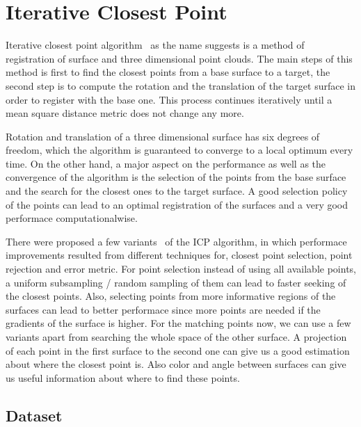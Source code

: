 \section{Iterative Closest Point}
\label{icp}

Iterative closest point algorithm~\cite{icpOr} as the name suggests is a method of registration of surface and three dimensional point clouds. The main steps of this method is first to find the closest points from a base surface to a target, the second step is to compute the rotation and the translation of the target surface in order to register with the base one. This process continues iteratively until a mean square distance metric does not change any more.

Rotation and translation of a three dimensional surface has six degrees of freedom, which the algorithm is guaranteed to converge to a local optimum every time. On the other hand, a major aspect on the performance as well as the convergence of the algorithm is the selection of the points from the base surface and the search for the closest ones to the target surface. A good selection policy of the points can lead to an optimal registration of the surfaces and a very good performace computationalwise.

There were proposed a few variants~\cite{icpVar} of the ICP algorithm, in which performace improvements resulted from different techniques for, closest point selection, point rejection and error metric. For point selection instead of using all available points, a uniform subsampling / random sampling of them can lead to faster seeking of the closest points. Also, selecting points from more informative regions of the surfaces can lead to better performace since more points are needed if the gradients of the surface is higher. For the matching points now, we can use a few variants apart from searching the whole space of the other surface. A projection of each point in the first surface to the second one can give us a good estimation about where the closest point is. Also color and angle between surfaces can give us useful information about where to find these points.

\subsection{Dataset}